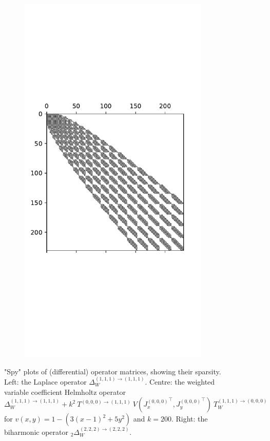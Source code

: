 \documentclass[11pt, oneside]{article}   	%
\newcommand{\laplacewiii}{\Delta_W^{(1,1,1)\to(1,1,1)}}
\newcommand{\biharmonictwo}{_2\Delta_W^{(2,2,2)\to(2,2,2)}}
\begin{document}
\begin{figure}[t]
\begin{subfigure}{0.32\textwidth}
	\includegraphics[scale=0.35]{sparsityofbiharmonic-diskslice-alpha=0p2-beta=0p8}
        \centering
	\end{subfigure}
    	\caption{"Spy" plots of (differential) operator matrices, showing their sparsity. Left: the Laplace operator $\laplacewiii$. Centre: the weighted variable coefficient Helmholtz operator $\laplacewiii + k^2 \: T^{(0,0,0)\to(1,1,1)} \: V({J_x^{(0,0,0)}}^\top, {J_y^{(0,0,0)}}^\top) \: T_W^{(1,1,1)\to(0,0,0)}$ for $v(x,y) = 1 - (3(x-1)^2 + 5y^2)$ and $k = 200$. Right: the biharmonic operator $\biharmonictwo$.}
        \label{fig:sparsity}
        \centering
\end{figure}
\end{document}
